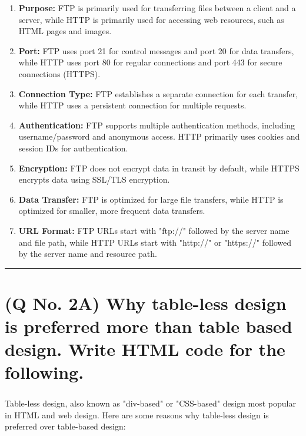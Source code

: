 \documentclass[11pt]{article}
\begin{document}
\begin{enumerate}
    \item \textbf{Purpose:} FTP is primarily used for transferring files between a client and a server, while HTTP is primarily used for accessing web resources, such as HTML pages and images.

    \item \textbf{Port:} FTP uses port 21 for control messages and port 20 for data transfers, while HTTP uses port 80 for regular connections and port 443 for secure connections (HTTPS).
    
    \item \textbf{Connection Type:} FTP establishes a separate connection for each transfer, while HTTP uses a persistent connection for multiple requests.
    
    \item \textbf{Authentication:} FTP supports multiple authentication methods, including username/password and anonymous access. HTTP primarily uses cookies and session IDs for authentication.
    
    \item \textbf{Encryption:} FTP does not encrypt data in transit by default, while HTTPS encrypts data using SSL/TLS encryption.
    
    \item \textbf{Data Transfer:} FTP is optimized for large file transfers, while HTTP is optimized for smaller, more frequent data transfers.
    
    \item \textbf{URL Format:} FTP URLs start with "ftp://" followed by the server name and file path, while HTTP URLs start with "http://" or "https://" followed by the server name and resource path.
\end{enumerate}
\noindent\rule{\linewidth}{0.4pt}

\section{(Q No. 2A) Why table-less design is preferred more than table based design. Write HTML code for the following.}
\subparagraph{}
Table-less design, also known as "div-based" or "CSS-based" design most popular in HTML and web design. Here are some reasons why table-less design is preferred over table-based design:
\end{document}
